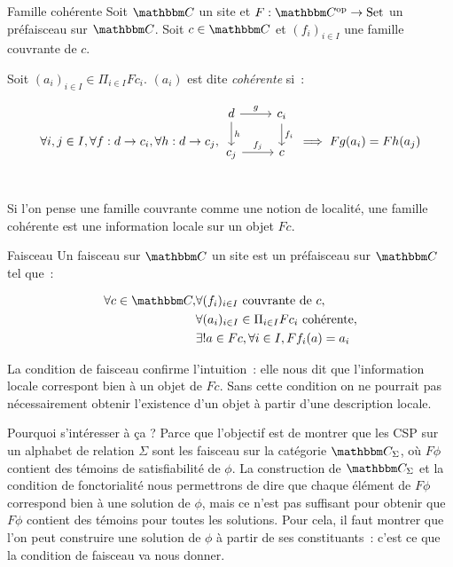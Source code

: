 \begin{defi}{Famille cohérente}
    Soit $\C$ un site et $F : \C^{\text{op}}\rightarrow\Set$ un préfaisceau sur
    $\C$. Soit $c\in\C$ et $(f_i)_{i\in I}$ une famille couvrante de $c$.
    
    Soit $(a_i)_{i\in I}\in \Pi_{i\in I} Fc_i$. $(a_i)$ est dite \emph{cohérente} si~:

    \[\forall i,j\in I, \forall f : d\rightarrow c_i, \forall h : d\rightarrow c_j,
      \begin{tikzcd}
          d \arrow[r, "g"] \arrow[d, "h"] & c_i \arrow[d, "f_i"] \\
          c_j \arrow[r, "f_j"] & c \\
      \end{tikzcd}
      \implies Fg(a_i) = Fh(a_j) \]
\end{defi}

Si l'on pense une famille couvrante comme une notion de localité, une famille cohérente
est une information locale sur un objet $Fc$.

\begin{defi}{Faisceau}
    Un faisceau sur $\C$ un site est un préfaisceau sur $\C$ tel que~:

    \begin{align*}
        \forall c\in\C, & \forall (f_i)_{i\in I}\text{ couvrante de } c, \\
                        & \forall (a_i)_{i\in I}\in\Pi_{i\in I}Fc_i \text{ cohérente}, \\
                        & \exists ! a\in Fc, \forall i\in I, Ff_i(a) = a_i
    \end{align*}
\end{defi}

La condition de faisceau confirme l'intuition~: elle nous dit que l'information locale
correspont bien à un objet de $Fc$. Sans cette condition on ne pourrait pas nécessairement
obtenir l'existence d'un objet à partir d'une description locale.

Pourquoi s'intéresser à ça ? Parce que l'objectif est de montrer que les CSP sur un 
alphabet de relation $\Sigma$ sont les faisceau sur la catégorie $\C_\Sigma$,
où $F\phi$ contient des témoins de satisfiabilité de $\phi$. La construction de $\C_\Sigma$
et la condition de fonctorialité nous permettrons de dire que chaque élément de $F\phi$
correspond bien à une solution de $\phi$, mais ce n'est pas suffisant pour obtenir que
$F\phi$ contient des témoins pour toutes les solutions. Pour cela, il faut montrer que
l'on peut construire une solution de $\phi$ à partir de ses constituants~: c'est ce que
la condition de faisceau va nous donner.

